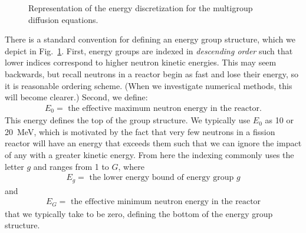 \begin{figure}[tb!]
\begin{center}
\caption{Representation of the energy discretization for the multigroup diffusion equations.}
\label{Fig:neutronics_energyGroupStructure}
\end{center}
\end{figure}

There is a standard convention for defining an energy group structure, which we depict in Fig.~\ref{Fig:neutronics_energyGroupStructure}. First, energy groups are indexed in \emph{descending order} such that lower indices correspond to higher neutron kinetic energies. This may seem backwards, but recall neutrons in a reactor begin as fast and lose their energy, so it is reasonable ordering scheme. (When we investigate numerical methods, this will become clearer.) Second, we define:
\begin{align}
  E_0 = \text{ the effective maximum neutron energy in the reactor.} \nonumber
\end{align}
This energy defines the top of the group structure. We typically use $E_0$ as 10 or 20~MeV, which is motivated by the fact that very few neutrons in a fission reactor will have an energy that exceeds them such that we can ignore the impact of any with a greater kinetic energy. From here the indexing commonly uses the letter $g$ and ranges from 1 to $G$, where
\begin{align}
  E_g = \text{ the lower energy bound of energy group $g$} \nonumber
\end{align}
and
\begin{align}
  E_G = \text{ the effective minimum neutron energy in the reactor} \nonumber
\end{align}
that we typically take to be zero, defining the bottom of the energy group structure.



